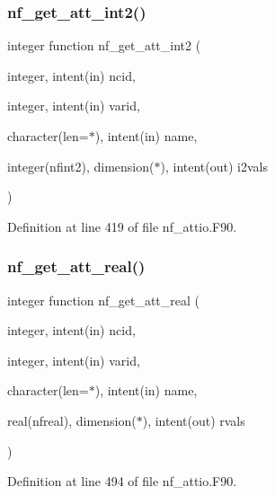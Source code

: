 \subsubsection{\texorpdfstring{nf\+\_\+get\+\_\+att\+\_\+int2()}{nf\_get\_att\_int2()}}
{\footnotesize\ttfamily integer function nf\+\_\+get\+\_\+att\+\_\+int2 (\begin{DoxyParamCaption}\item[{integer, intent(in)}]{ncid,  }\item[{integer, intent(in)}]{varid,  }\item[{character(len=$\ast$), intent(in)}]{name,  }\item[{integer(nfint2), dimension($\ast$), intent(out)}]{i2vals }\end{DoxyParamCaption})}



Definition at line 419 of file nf\+\_\+attio.\+F90.

\mbox{\label{nf__attio_8F90_acafbf0e38b23214903386ffe3f39ba40}} 
\subsubsection{\texorpdfstring{nf\+\_\+get\+\_\+att\+\_\+real()}{nf\_get\_att\_real()}}
{\footnotesize\ttfamily integer function nf\+\_\+get\+\_\+att\+\_\+real (\begin{DoxyParamCaption}\item[{integer, intent(in)}]{ncid,  }\item[{integer, intent(in)}]{varid,  }\item[{character(len=$\ast$), intent(in)}]{name,  }\item[{real(nfreal), dimension($\ast$), intent(out)}]{rvals }\end{DoxyParamCaption})}



Definition at line 494 of file nf\+\_\+attio.\+F90.

\mbox{\label{nf__attio_8F90_a5dc31d1a771da746f09a58761d5bee49}} 
